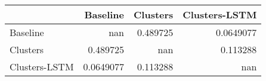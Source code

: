 \begin{tabular}{lrrr}
\toprule
               &    Baseline &   Clusters &   Clusters-LSTM \\
\midrule
 Baseline      & nan         &   0.489725 &       0.0649077 \\
 Clusters      &   0.489725  & nan        &       0.113288  \\
 Clusters-LSTM &   0.0649077 &   0.113288 &     nan         \\
\bottomrule
\end{tabular}